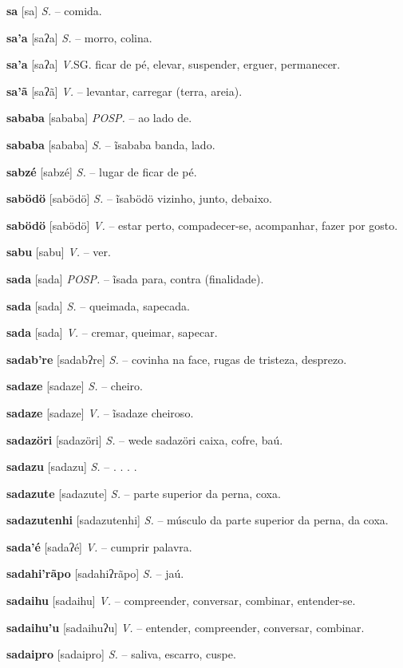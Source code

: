 \textbf{sa} [sa] \textit{S.} -- comida.

\textbf{sa'a} [saʔa] \textit{S.} -- morro, colina.

\textbf{sa'a} [saʔa] \textit{V.}SG. ficar de pé, elevar, suspender, erguer, permanecer.

\textbf{sa'ã} [saʔã] \textit{V.} -- levantar, carregar (terra, areia).

\textbf{sababa} [sababa] \textit{POSP.} -- ao lado de.

\textbf{sababa} [sababa] \textit{S.} -- ĩsababa banda, lado.

\textbf{sabzé} [sabzé] \textit{S.} -- lugar de ficar de pé.

\textbf{sabödö} [sabödö] \textit{S.} -- ĩsabödö vizinho, junto, debaixo.

\textbf{sabödö} [sabödö] \textit{V.} -- estar perto, compadecer-se, acompanhar, fazer por gosto.

\textbf{sabu} [sabu] \textit{V.} -- ver.

\textbf{sada} [sada] \textit{POSP.} -- ĩsada para, contra (finalidade).

\textbf{sada} [sada] \textit{S.} -- queimada, sapecada.

\textbf{sada} [sada] \textit{V.} -- cremar, queimar, sapecar.

\textbf{sadab're} [sadabʔre] \textit{S.} -- covinha na face, rugas de tristeza, desprezo.

\textbf{sadaze} [sadaze] \textit{S.} -- cheiro.

\textbf{sadaze} [sadaze] \textit{V.} -- ĩsadaze cheiroso.

\textbf{sadazöri} [sadazöri] \textit{S.} -- wede sadazöri caixa, cofre, baú.

\textbf{sadazu} [sadazu] \textit{S.} -- . . . .

\textbf{sadazute} [sadazute] \textit{S.} -- parte superior da perna, coxa.

\textbf{sadazutenhi} [sadazutenhi] \textit{S.} -- músculo da parte superior da perna, da coxa.

\textbf{sada'é} [sadaʔé] \textit{V.} -- cumprir palavra.

\textbf{sadahi'rãpo} [sadahiʔrãpo] \textit{S.} -- jaú.

\textbf{sadaihu} [sadaihu] \textit{V.} -- compreender, conversar, combinar, entender-se.

\textbf{sadaihu'u} [sadaihuʔu] \textit{V.} -- entender, compreender, conversar, combinar.

\textbf{sadaipro} [sadaipro] \textit{S.} -- saliva, escarro, cuspe.

